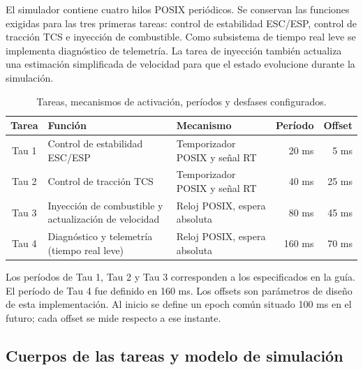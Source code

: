 \documentclass[12pt,a4paper]{article}
\begin{document}
El simulador contiene cuatro hilos POSIX periódicos. Se conservan las funciones exigidas para las tres primeras tareas: control de estabilidad ESC/ESP, control de tracción TCS e inyección de combustible. Como subsistema de tiempo real leve se implementa diagnóstico de telemetría. La tarea de inyección también actualiza una estimación simplificada de velocidad para que el estado evolucione durante la simulación.

\begin{table}[htbp]
  \centering
  \caption{Tareas, mecanismos de activación, períodos y desfases configurados.}
  \label{tab:tareas}
  \small
  \begin{tabularx}{\linewidth}{@{}c X X r r@{}}
    \toprule
    Tarea & Función & Mecanismo & Período & Offset \\
    \midrule
    Tau 1 & Control de estabilidad ESC/ESP & Temporizador POSIX y señal RT & 20 ms & 5 ms \\
    Tau 2 & Control de tracción TCS & Temporizador POSIX y señal RT & 40 ms & 25 ms \\
    Tau 3 & Inyección de combustible y actualización de velocidad & Reloj POSIX, espera absoluta & 80 ms & 45 ms \\
    Tau 4 & Diagnóstico y telemetría (tiempo real leve) & Reloj POSIX, espera absoluta & 160 ms & 70 ms \\
    \bottomrule
  \end{tabularx}
\end{table}

Los períodos de Tau 1, Tau 2 y Tau 3 corresponden a los especificados en la guía. El período de Tau 4 fue definido en 160 ms. Los offsets son parámetros de diseño de esta implementación. Al inicio se define un epoch común situado 100 ms en el futuro; cada offset se mide respecto a ese instante.

\subsection{Cuerpos de las tareas y modelo de simulación}
\end{document}
